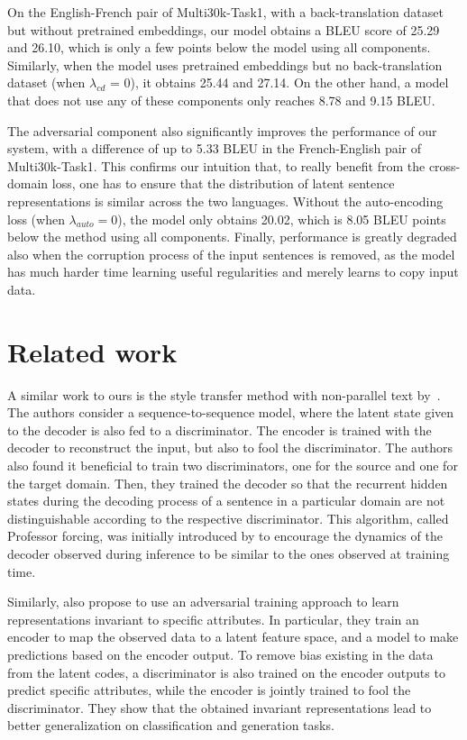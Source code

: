 \documentclass{article} \usepackage{iclr2018_conference,times}
\begin{document}
On the English-French pair of Multi30k-Task1, with a back-translation dataset but without pretrained embeddings, our model obtains a BLEU score of 25.29 and 26.10, which is only a few points below the model using all components. Similarly, when the model uses pretrained embeddings but no back-translation dataset (when $\lambda_{cd}$ = 0), it obtains 25.44 and 27.14. On the other hand, a model that does not use any of these components only reaches 8.78 and 9.15 BLEU. 

The adversarial component also significantly improves the performance of our system, with a difference of up to 5.33 BLEU in the French-English pair of Multi30k-Task1. This confirms our intuition that, to really benefit from the cross-domain loss, one has to ensure that the distribution of latent sentence representations is similar across the two languages. Without the auto-encoding loss (when $\lambda_{auto}=0$), the model only obtains 20.02, which is 8.05 BLEU points below the method using all components. Finally, performance is greatly degraded also when the corruption process of the input sentences is removed, as the model has much harder time learning useful regularities and merely learns to copy input data.
  \section{Related work}
\label{sec:related_work}

A similar work to ours is the style transfer method with non-parallel text by~\citet{shen2017style}. The authors consider a sequence-to-sequence model, where the latent state given to the decoder is also fed to a discriminator. The encoder is trained with the decoder to reconstruct the input, but also to fool the discriminator. The authors also found it beneficial to train two discriminators, one for the source and one for the target domain. Then, they trained the decoder so that the recurrent hidden states during the decoding process of a sentence in a particular domain are not distinguishable according to the respective discriminator. This algorithm, called Professor forcing, was initially introduced by \citet{lamb2016professor} to encourage the dynamics of the decoder observed during inference to be similar to the ones observed at training time.

Similarly, \citet{xie2017controllable} also propose to use an adversarial training approach to learn representations invariant to specific attributes. In particular, they train an encoder to map the observed data to a latent feature space, and a model to make predictions based on the encoder output. To remove bias existing in the data from the latent codes, a discriminator is also trained on the encoder outputs to predict specific attributes, while the encoder is jointly trained to fool the discriminator. They show that the obtained invariant representations lead to better generalization on classification and generation tasks.
\end{document}
